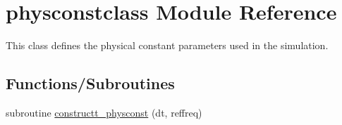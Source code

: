 \hypertarget{namespacephysconstclass}{}\section{physconstclass Module Reference}
\label{namespacephysconstclass}


This class defines the physical constant parameters used in the simulation.  


\subsection*{Functions/\+Subroutines}
\begin{DoxyCompactItemize}
\item 
subroutine \mbox{\hyperlink{namespacephysconstclass_a9363467b39854297442c284c2c9fbe07}{constructt\+\_\+physconst}} (dt, reffreq)
\end{DoxyCompactItemize}
